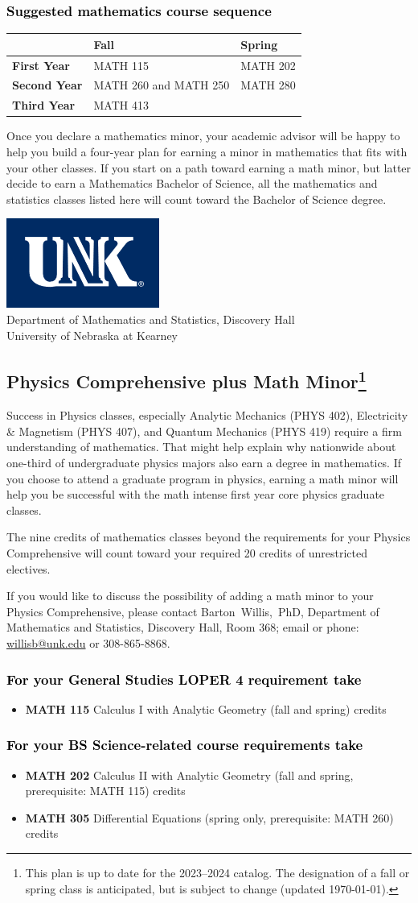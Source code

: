 \documentclass[10pt]{article}
\makeatletter
\newcommand{\calcone}{\textbf{MATH 115} Calculus I with Analytic Geometry (fall and spring) \dotfill 5 credits}
\newcommand{\calconeshort}{MATH 115}
\newcommand{\calctwo}{\textbf{MATH 202} Calculus II with Analytic Geometry (fall and spring, prerequisite: MATH 115) \dotfill 5 credits }
\newcommand{\calctwoshort}{MATH 202}
\newcommand{\foundationsshort}{MATH 250}
\newcommand{\calcthreeshort}{MATH 260}
\newcommand{\linearshort}{MATH 280}
\newcommand{\discreteshort}{MATH 413}
\newcommand{\diffeq}{\textbf{MATH 305}	Differential Equations (spring only, prerequisite: MATH 260) \dotfill 	3 credits}
\newcommand{\contactbw}{\mbox{Barton Willis, PhD}, Department of Mathematics and Statistics,  Discovery Hall, Room 368;
email or phone: \href{mailto:willisb@unk.edu}{willisb@unk.edu} or 308-865-8868.}
\newcommand{\forinfo}[2]{If you would like to discuss the possibility of adding a math {#1} to your {#2}, please contact \contactbw}
\newcommand{\catalog}{2023--2024 }
\newcommand{\LOPER}{LOPER\xspace}
\newcommand{\myfootnote}{\footnote{This plan is up to date for  the \catalog catalog. The designation of a fall or spring class is 
anticipated, but  is subject to change (updated \today).}}
\newcommand{\myheading}{
\begin{flushleft}
\includegraphics[scale=0.35]{unk-logo}\\
\setcounter{footnote}{0}
\vspace{0.25in}
 \textcolor{unkblue}{Department of Mathematics and Statistics, Discovery Hall} \\
  \textcolor{unkblue}{University of Nebraska at Kearney}
\end{flushleft}}
\newcommand{\mathminor}{
   \begin{tabular}[h]{| l | l | l|} 
      \hline
                 & \textbf{Fall}         &  \textbf{Spring}  \\ \hline 
      \textbf{First Year} & \calconeshort & \calctwoshort \\  \hline
      \textbf{Second Year} &  \calcthreeshort{} and \foundationsshort{} &  \linearshort \\ \hline
      \textbf{Third Year} &    \discreteshort              &  \\ \hline
      \end{tabular}}
\makeatother
\begin{document}
\vspace{-0.1in}
\subsubsection*{\textcolor{black}{Suggested mathematics course sequence}}

\mathminor

\vspace{0.1in}
\noindent Once you declare a mathematics minor, your academic advisor 
will be happy to help you build a four-year plan for earning a minor 
in mathematics that fits with your other classes.  If you start on 
a path toward earning a math minor, but latter decide to earn a  
Mathematics Bachelor of Science, all the mathematics and statistics  classes listed here will count toward the Bachelor of Science degree.


\newpage

\myheading


\subsection*{\textbf{\textcolor{unkblue}{Physics Comprehensive plus Math Minor\myfootnote}}}

\noindent Success in Physics classes, especially  Analytic Mechanics (PHYS 402), Electricity \& Magnetism (PHYS 407), and Quantum Mechanics (PHYS 419) require a firm understanding of mathematics. That might help explain why nationwide about one-third of undergraduate physics majors also earn a degree in mathematics. If you choose to attend a graduate program in physics, earning a math minor will help you be successful with the math intense first year core physics graduate classes.

The nine credits of mathematics classes beyond the requirements for your Physics Comprehensive will count toward your required 20 credits of unrestricted electives.


\forinfo{minor}{Physics Comprehensive}

\subsubsection*{\textcolor{black}{For your General Studies \LOPER 4 requirement take}}
\begin{itemize}
\item \calcone
\end{itemize}

\subsubsection*{\textcolor{black}{For your BS Science-related course requirements take}}
\begin{itemize}
\item \calctwo
\item \diffeq
\end{itemize}
\end{document}
